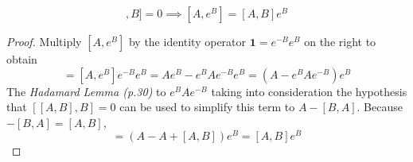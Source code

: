 \begin{sol}
\begin{lemma}
\begin{equation}
	[[A,B],B]=0\implies[A,e^B]=[A,B]e^B
\end{equation}
\end{lemma}
\begin{proof}
Multiply $[A,e^B]$ by the identity operator $\mathbf 1=e^{-B}e^B$ on the right to obtain
\begin{equation}
	[A,e^B]=[A,e^B]e^{-B}e^B=Ae^B-e^BAe^{-B}e^B=(A-e^BAe^{-B})e^B
\end{equation} 
The \textit{Hadamard Lemma (p.30)} to $e^BAe^{-B}$ taking into consideration the hypothesis that $[[A,B],B]=0$ can be used to simplify this term to $A-[B,A]$. Because $-[B,A]=[A,B]$, 
\begin{equation}
	[A,e^B]=(A-A+[A,B])e^B=[A,B]e^B
\end{equation}



\end{proof}
\end{sol}
